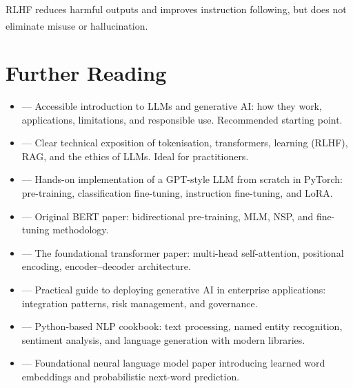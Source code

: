 \begin{tcbitemize}[ skin=sectionraster ]
    RLHF reduces harmful outputs and improves instruction following, but does not
    eliminate misuse or
    hallucination.\textsuperscript{\cite[][p.~73-74]{farrisHowLargeLanguage2025}}

\end{tcbitemize}

\section{Further Reading}

\begin{tcbitemize}[ skin=sectionraster ]

    \tcbitem[title=Recommended Sources for NLP and Generative AI, raster multicolumn=6]
    \begin{itemize}
        \item {} --- Accessible introduction to LLMs and generative AI: how they work, applications, limitations, and responsible use. Recommended starting point.
        \item {} --- Clear technical exposition of tokenisation, transformers, learning (RLHF), RAG, and the ethics of LLMs. Ideal for practitioners.
        \item {} --- Hands-on implementation of a GPT-style LLM from scratch in PyTorch: pre-training, classification fine-tuning, instruction fine-tuning, and LoRA.
        \item {} --- Original BERT paper: bidirectional pre-training, MLM, NSP, and fine-tuning methodology.
        \item {} --- The foundational transformer paper: multi-head self-attention, positional encoding, encoder--decoder architecture.
        \item {} --- Practical guide to deploying generative AI in enterprise applications: integration patterns, risk management, and governance.
        \item {} --- Python-based NLP cookbook: text processing, named entity recognition, sentiment analysis, and language generation with modern libraries.
        \item {} --- Foundational neural language model paper introducing learned word embeddings and probabilistic next-word prediction.
    \end{itemize}

\end{tcbitemize}
